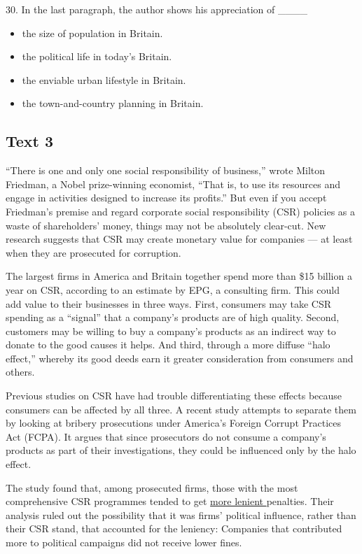 \documentclass[UTF8,11pt]{ctexart}
\begin{document}
30. In the last paragraph, the author shows his appreciation of \_\_\_\_


\begin{itemize}[leftmargin=2em,itemsep=.2em,topsep=.4em]\item[A.] the size of population in Britain.
\item[B.] the political life in today’s Britain.
\item[C.] the enviable urban lifestyle in Britain.
\item[D.] the town-and-country planning in Britain.
\end{itemize}

\subsection*{\textbf{Text 3}}


“There is one and only one social responsibility of business,” wrote Milton Friedman, a Nobel prize-winning economist, “That is, to use its resources and engage in activities designed to increase its profits.” But even if you accept Friedman’s premise and regard corporate social responsibility (CSR) policies as a waste of shareholders’ money, things may not be absolutely clear-cut. New research suggests that CSR may create monetary value for companies — at least when they are prosecuted for corruption.


The largest firms in America and Britain together spend more than \$15 billion a year on CSR, according to an estimate by EPG, a consulting firm. This could add value to their businesses in three ways. First, consumers may take CSR spending as a “signal” that a company’s products are of high quality. Second, customers may be willing to buy a company’s products as an indirect way to donate to the good causes it helps. And third, through a more diffuse “halo effect,” whereby its good deeds earn it greater consideration from consumers and others.


Previous studies on CSR have had trouble differentiating these effects because consumers can be affected by all three. A recent study attempts to separate them by looking at bribery prosecutions under America’s Foreign Corrupt Practices Act (FCPA). It argues that since prosecutors do not consume a company’s products as part of their investigations, they could be influenced only by the halo effect.


The study found that, among prosecuted firms, those with the most comprehensive CSR programmes tended to get \uline{more lenient }penalties. Their analysis ruled out the possibility that it was firms’ political influence, rather than their CSR stand, that accounted for the leniency: Companies that contributed more to political campaigns did not receive lower fines.
\end{document}
